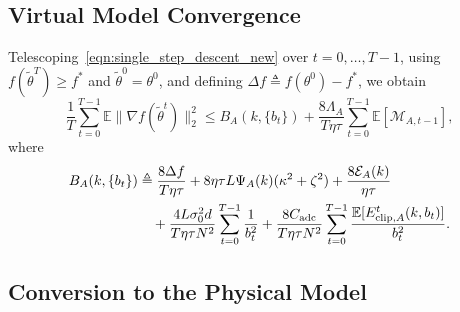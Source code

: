 \documentclass[conference]{IEEEtran}
\begin{document}
\subsection{Virtual Model Convergence}

Telescoping~\eqref{eqn:single_step_descent_new} over $t=0,\ldots,T-1$, using $f(\tilde\theta^T)\ge f^*$ and $\tilde\theta^0=\theta^0$, and defining $\Delta f\triangleq f(\theta^0)-f^*$, we obtain
\begin{equation}
    \label{eqn:virtual_bound_with_memory}
    \frac1T\sum_{t=0}^{T-1}\mathbb{E}\|\nabla f(\tilde\theta^t)\|_2^2
    \le
    B_A(k,\{b_t\})+
    \frac{8\Lambda_A}{T\eta\tau}\sum_{t=0}^{T-1}\mathbb{E}[\mathcal{M}_{A,t-1}],
\end{equation}
where
\begin{align}
    B_A(k,\{b_t\})
    &\triangleq
    \frac{8\Delta f}{T\eta\tau}
    +8\eta\tau L\Psi_A(k)(\kappa^2+\zeta^2)
    +\frac{8\mathcal{E}_A(k)}{\eta\tau}
    \notag\\
    &\quad+
    \frac{4L\sigma_0^2d}{T\eta\tau N^2}\sum_{t=0}^{T-1}\frac1{b_t^2}
    +
    \frac{8C_{\mathrm{adc}}}{T\eta\tau N^2}
    \sum_{t=0}^{T-1}
    \frac{\mathbb{E}[E_{\mathrm{clip},A}^t(k,b_t)]}{b_t^2}.
\end{align}


\subsection{Conversion to the Physical Model}
\end{document}
